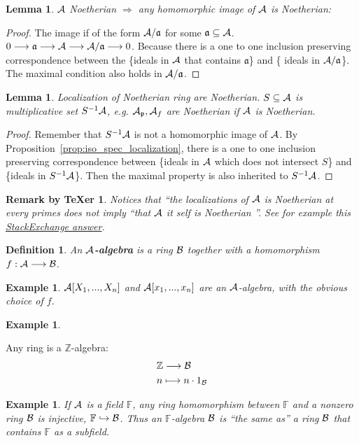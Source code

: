 \documentclass[11pt]{article}
\newtheorem{lemma}[thm]{Lemma}
\newtheorem{dfn}[thm]{Definition}
\newtheorem{rmkt}[thm]{Remark by TeXer}
\newtheorem{ex}[thm]{Example}
\newcommand{\intg}{\mathbb Z}
\newcommand{\bbf}{\mathbb F}
\newcommand{\sca}{{\mathfrak a}}
\newcommand{\scp}{{\mathfrak p}}
\newcommand{\cala}{{\cal A}}
\newcommand{\calb}{{\cal B}}
\newcommand{\Lrta}{\Longrightarrow}
\newcommand{\lrta}{\longrightarrow}
\newcommand{\inj}{\hookrightarrow}
\begin{document}
\begin{lemma}\label{lem:homomorphic_image_Noetherian}
$\cala$ Noetherian
$\Lrta$ any homomorphic image of $\cala$ is Noetherian:
\end{lemma}
\begin{proof}
The image if of the form $\cala/\sca$ for some $\sca\subseteq \cala$.
$0\lrta \sca\lrta \cala\lrta \cala/\sca\lrta 0$. Because there is a one to one inclusion preserving  correspondence between the \{ideals in $\cala$ that contains $\sca$\} and \{ ideals in $\cala/\sca$\}. The maximal condition also holds in $\cala/\sca$.
\end{proof}
\begin{lemma}
Localization of  Noetherian ring are Noetherian. $S\subseteq \cala$ is multiplicative set $S^{-1}\cala$, e.g. $\cala_\scp,\cala_f$ are Noetherian if $\cala$ is Noetherian.
\end{lemma}
\begin{proof}
Remember that $S^{-1}\cala$ is not a homomorphic image of $\cala$. By Proposition~\ref{prop:iso_spec_localization}, there is a one to one inclusion preserving correspondence between \{ideals in $\cala$ which does not intersect $S$\} and \{ideals in $S^{-1}\cala$\}. Then the maximal property is also inherited to $S^{-1}\cala$.
\end{proof}
\begin{rmkt}
Notices that ``the localizations of $\cala$ is Noetherian at every primes does not imply ``that $\cala$ it self is Noetherian ''. See for example this \href{https://math.stackexchange.com/questions/73421/a-non-noetherian-ring-with-all-localizations-noetherian}{StackExchange answer}.
\end{rmkt}

\begin{dfn}
An \textbf{$\cala$-algebra} is a ring $\calb$ together with a homomorphism $f:\cala\lrta \calb$.
\end{dfn}

\begin{ex}
$\cala[X_1,...,X_n]$ and $\cala[x_1,...,x_n]$ are an $\cala$-algebra, with the obvious choice of $f$.
\end{ex}
\begin{ex}

\end{ex}Any ring is a $\intg$-algebra:
$$
\begin{aligned}
&\intg \lrta \calb\\
&n\longmapsto n \cdot 1_\calb
\end{aligned}
$$
\begin{ex}
If $\cala$ is a field $\bbf$, any ring homomorphism between $\bbf$ and a nonzero ring $\calb$ is injective, $\bbf\inj \calb$. Thus an $\bbf$-algebra $\calb$ is ``the same as'' a ring $\calb$ that contains $\bbf$ as a subfield.
\end{ex}
\end{document}

